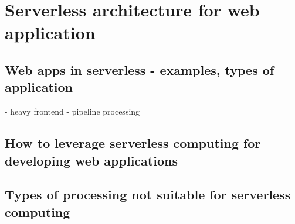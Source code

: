 \chapter{Serverless architecture for web application}

\section*{Web apps in serverless - examples, types of application}

- heavy frontend
- pipeline processing

\section*{How to leverage serverless computing for developing web applications}

\section*{Types of processing not suitable for serverless computing}
